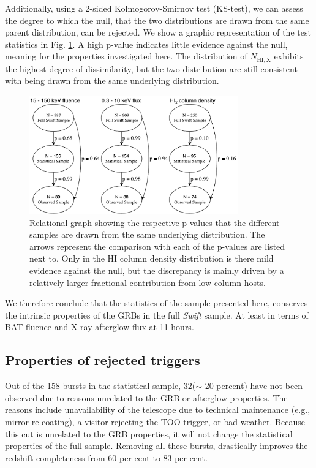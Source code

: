 \documentclass{aa}    %
\begin{document}
Additionally, using a 2-sided Kolmogorov-Smirnov test (KS-test), we can assess
the degree to which the null, that the two distributions are drawn from the same
parent distribution, can be rejected. We show a graphic representation of the
test statistics in Fig. \ref{fig:p_values}. A high p-value indicates little
evidence against the null, meaning for the properties investigated here. The
distribution of $N_{\mathrm{HI,X}}$ exhibits the highest degree of
dissimilarity, but the two distribution are still consistent with being drawn
from the same underlying distribution.

\begin{figure}
	\centerline{\includegraphics[width=9cm]{figures/XSGRB_p_values.pdf}}
	\caption{Relational graph showing the respective p-values that the different
	samples are drawn from the same underlying distribution. The arrows represent
	the comparison with each of the p-values are listed next to. Only in the HI
	column density distribution is there mild evidence against the null, but the
	discrepancy is mainly driven by a relatively larger fractional contribution
	from low-column hosts.}
	\label{fig:p_values}
\end{figure}

We therefore conclude that the statistics of the sample presented here,
conserves the intrinsic properties of the GRBs in the full \textit{Swift}
sample. At least in terms of BAT fluence and X-ray afterglow flux at 11 hours.

\subsection{Properties of rejected triggers} \label{badbursts}

Out of the 158 bursts in the statistical sample, 32($\sim$ 20 percent) have not
been observed due to reasons unrelated to the GRB or afterglow properties. The
reasons include unavailability of the telescope due to technical maintenance
(e.g., mirror re-coating), a visitor rejecting the TOO trigger, or bad weather.
Because this cut is unrelated to the GRB properties, it will not change the
statistical properties of the full sample. Removing all these bursts,
drastically improves the redshift completeness from 60 per cent to 83 per cent.
\end{document}
